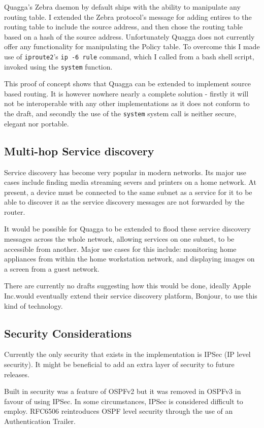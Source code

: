 \documentclass[12pt]{report}
\begin{document}
Quagga's Zebra daemon by default ships with the ability to manipulate any
routing table. I extended the Zebra protocol's message for adding entires to
the routing table to include the source address, and then chose the routing
table based on a hash of the source address.  Unfortunately Quagga does not
currently offer any functionality for manipulating the Policy table. To
overcome this I made use of \texttt{iproute2}'s \texttt{ip -6 rule} command,
which I called from a bash shell script, invoked using the \texttt{system}
function. 

This proof of concept shows that Quagga can be extended to implement source
based routing. It is however nowhere nearly a complete solution - firstly it
will not be interoperable with any other implementations as it does not conform
to the draft, and secondly the use of the \texttt{system} system call is
neither secure, elegant nor portable. 

\subsection{Multi-hop Service discovery}
Service discovery has become very popular in modern networks. Its major use
cases include finding media streaming severs and printers on a home network. At
present, a device must be connected to the same subnet as a service for it to
be able to discover it as the service discovery messages are not forwarded by
the router. 

It would be possible for Quagga to be extended to flood these service discovery
messages across the whole network, allowing services on one subnet, to be
accessible from another. Major use cases for this include: monitoring home
appliances from within the home workstation network, and displaying images on a
screen from a guest network.

There are currently no drafts suggesting how this would be done, ideally Apple
Inc.\@ would eventually extend their service discovery platform, Bonjour, to
use this kind of technology.

\subsection{Security Considerations}
Currently the only security that exists in the implementation is IPSec (IP
level security). It might be beneficial to add an extra layer of security to future 
releases.

Built in security was a feature of OSPFv2 but it was removed in OSPFv3 in favour of 
using IPSec. In some circumstances, IPSec is considered difficult to employ. 
RFC6506 reintroduces OSPF level security through the use of an Authentication 
Trailer. 
\end{document}
